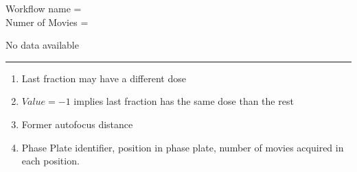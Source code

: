 \documentclass[12pt,a4paper]{article}
\newif\iflong
\begin{document}
Workflow name = \\
Numer of Movies = 
\iflong
\begin{figure}[!htbp]
    \caption{Resolution Histogram.\label{fig:resHist}}
    \centering
    }
\end{figure}

\begin{figure}[!htbp]
    \caption{Defocus Histogram.\label{fig:defHist}}
    \centering
    }
\end{figure}
\else
No data available
\fi

\vspace{\fill}
\rule{5cm}{1px}
{\footnotesize
\begin{enumerate}
\item {Last fraction may have a different dose}
\item {$Value = -1$ implies last fraction has the same dose than the rest}
\item Former autofocus distance
\item Phase Plate identifier, position in phase plate, number of movies acquired in each position.
\end{enumerate}
}
\end{document}
